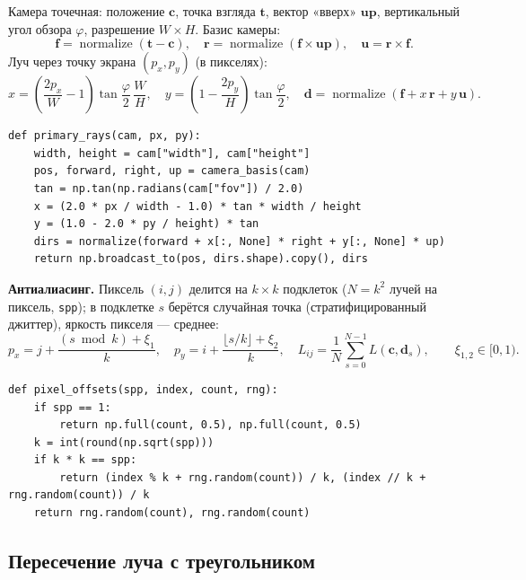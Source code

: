 \documentclass[12pt,a4paper]{article}
\newcommand{\vect}[1]{\mathbf{#1}}
\newcommand{\nrm}{\operatorname{normalize}}
\begin{document}
Камера точечная: положение $\vect c$, точка взгляда $\vect t$, вектор «вверх» $\vect{up}$, вертикальный угол обзора $\varphi$,
разрешение $W\times H$. Базис камеры:
\begin{equation}
\vect f = \nrm(\vect t - \vect c),\quad \vect r = \nrm(\vect f\times\vect{up}),\quad \vect u = \vect r\times\vect f.
\end{equation}
Луч через точку экрана $(p_x, p_y)$ (в пикселях):
\begin{equation}
x = \left(\frac{2p_x}{W}-1\right)\tan\frac{\varphi}{2}\,\frac{W}{H},\quad
y = \left(1-\frac{2p_y}{H}\right)\tan\frac{\varphi}{2},\quad
\vect d = \nrm(\vect f + x\,\vect r + y\,\vect u).
\end{equation}

\begin{lstlisting}
def primary_rays(cam, px, py):
    width, height = cam["width"], cam["height"]
    pos, forward, right, up = camera_basis(cam)
    tan = np.tan(np.radians(cam["fov"]) / 2.0)
    x = (2.0 * px / width - 1.0) * tan * width / height
    y = (1.0 - 2.0 * py / height) * tan
    dirs = normalize(forward + x[:, None] * right + y[:, None] * up)
    return np.broadcast_to(pos, dirs.shape).copy(), dirs
\end{lstlisting}

\textbf{Антиалиасинг.} Пиксель $(i,j)$ делится на $k\times k$ подклеток ($N=k^2$ лучей на пиксель, \texttt{spp});
в подклетке $s$ берётся случайная точка (стратифицированный джиттер), яркость пикселя — среднее:
\begin{equation}
p_x = j + \frac{(s \bmod k) + \xi_1}{k},\quad p_y = i + \frac{\lfloor s/k\rfloor + \xi_2}{k},\quad
L_{ij} = \frac{1}{N}\sum_{s=0}^{N-1} L(\vect c, \vect d_s),\qquad \xi_{1,2}\in[0,1).
\end{equation}

\begin{lstlisting}
def pixel_offsets(spp, index, count, rng):
    if spp == 1:
        return np.full(count, 0.5), np.full(count, 0.5)
    k = int(round(np.sqrt(spp)))
    if k * k == spp:
        return (index % k + rng.random(count)) / k, (index // k + rng.random(count)) / k
    return rng.random(count), rng.random(count)
\end{lstlisting}

\subsection{Пересечение луча с треугольником}
\end{document}
